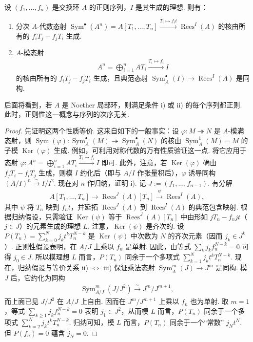 \begin{proposition*}
设 $(f_1,\ldots,f_n)$ 是交换环 $A$ 的正则序列，$I$ 是其生成的理想. 则有：
\begin{enumerate}[label=\roman*)]
\item 分次 $A$-代数态射 $\operatorname{Sym}^{\bullet}(A^n)=A[T_1,\ldots,T_n]\xrightarrow{T_i\mapsto f_it}\operatorname{Rees}^{I}(A)$ 的核由所有的 $f_iT_j-f_jT_i$ 生成.
\item $A$-模态射
\begin{align*}
A^n=\bigoplus_{i=1}^nAT_i\xrightarrow{T_i\mapsto f_i}I
\end{align*}
的核由所有的 $f_iT_j-f_jT_i$ 生成，且典范态射 $\operatorname{Sym}_A^{\bullet}(I)\longrightarrow\operatorname{Rees}^{I}(A)$ 是同构.
\end{enumerate}
\end{proposition*}
后面将看到，若 $A$ 是 Noether 局部环，则满足条件 i) 或 ii) 的每个序列都正则. 此时，正则性这一概念与序列的次序无关.
\begin{proof}
先证明这两个性质等价. 这来自如下的一般事实：设 $\varphi:M\twoheadrightarrow N$ 是 $A$-模满态射，则 $\operatorname{Sym}(\varphi):\operatorname{Sym}_A^{\bullet}(M)\twoheadrightarrow\operatorname{Sym}_A^{\bullet}(N)$ 的核由 $\operatorname{Sym}_A^1(M)=M$ 的子模 $\operatorname{Ker}(\varphi)$ 生成. 例如，可利用对称代数的万有性质验证这一点. 将它应用于态射 $\varphi:A^n=\bigoplus_{i=1}^nAT_i\xrightarrow{T_i\mapsto f_i}I$ 即可. 此外，注意，若 $\operatorname{Ker}(\varphi)$ 确由 $f_jT_i-f_iT_j$ 生成，则模 $I$ 约化后（即与 $A/I$ 作张量积后），$\varphi$ 诱导同构 $(A/I)^n\xrightarrow\sim I/I^2$.
现在对 $n$ 作归纳，证明 i). 记 $J:=(f_1,\ldots,f_{n-1})$. 有分解
\begin{align}
A[T_1,\ldots,T_n]\longrightarrow\operatorname{Rees}^{J}(A)[T_n]\xrightarrow{\psi}\operatorname{Rees}^{I}(A),\tag{2.2.4.2}\label{eq:ag-2-2-4-2}
\end{align}
其中 $\psi$ 将 $T_n$ 映到 $f_nt$，并延拓 $\operatorname{Rees}^{J}(A)$ 到 $\operatorname{Rees}^{I}(A)$ 的典范包含映射. 根据归纳假设，只需验证 $\operatorname{Ker}(\psi)$ 等于 $\operatorname{Rees}^{J}(A)[T_n]$ 中由形如 $jT_n-f_njt$（$j\in J$）的元素生成的理想 $L$.
注意，$\operatorname{Ker}(\psi)$ 是齐次的. 设 $P(T_n)=\sum_{k=0}^Nj_kt^kT_n^{N-k}$ 是 $\operatorname{Ker}(\psi)$ 中次数为 $N$ 的齐次元素（因而 $j_k\in J^k$）. 正则性假设表明，在 $A/J$ 上乘以 $f_n$ 是单射. 因此，由等式 $\sum_kj_kf_n^{N-k}=0$ 可得 $j_0\in J$. 所以模理想 $L$ 而言，$P(T_n)$ 同余于一个多项式 $\sum_{k=1}^Nj_kt^kT_n^{N-k}$. 现在，归纳假设与等价关系 ii) $\Leftrightarrow$ iii) 保证乘法态射 $\operatorname{Sym}_A^m(J)\longrightarrow J^m$ 是同构. 模 $J$ 后，它约化为同构
\begin{align*}
\operatorname{Sym}_{A/J}^m(J/J^2)\xrightarrow\sim J^m/J^{m+1},
\end{align*}
而上面已见 $J/J^2$ 在 $A/J$ 上自由. 因而在 $J^m/J^{m+1}$ 上乘以 $f_n$ 也为单射. 取 $m=1$，等式 $\sum_{k\geqslant1}j_kf_n^{N-k}=0$ 表明 $j_1\in J^2$，从而模 $L$ 而言，$P(T_n)$ 同余于一个多项式 $\sum_{k=2}^Nj_kt^kT_n^{N-k}$. 归纳可知，模 $L$ 而言，$P(T_n)$ 同余于一个``常数'' $j_Nt^N$. 但 $P(f_n)=0$ 蕴含 $j_N=0$.
\end{proof}
